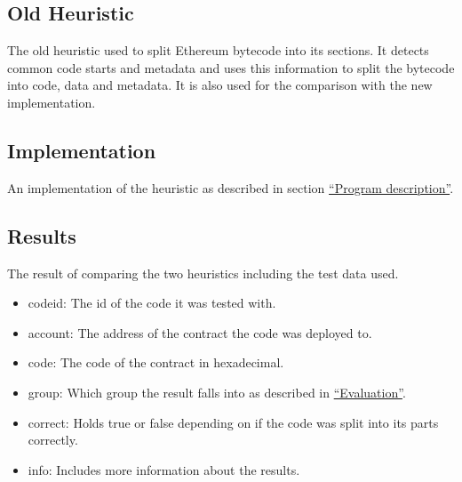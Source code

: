 \documentclass{article}
\begin{document}
\subsection{Old Heuristic\cite{section.py}}
    The old heuristic used to split Ethereum bytecode into its sections. It detects common code starts and metadata and uses this information to split the bytecode into code, data and metadata. It is also used for the comparison with the new implementation.
\subsection{Implementation\cite{codeseg}}
    An implementation of the heuristic as described in section \hyperref[description]{``Program description''}.
\subsection{Results\cite{result.csv}}
    The result of comparing the two heuristics including the test data used.
    \begin{itemize}
        \item codeid: The id of the code it was tested with.
        \item account: The address of the contract the code was deployed to.
        \item code: The code of the contract in hexadecimal.
        \item group: Which group the result falls into as described in \hyperref[eval]{``Evaluation''}.
        \item correct: Holds true or false depending on if the code was split into its parts correctly. 
        \item info: Includes more information about the results. 
    \end{itemize}


\end{document}
